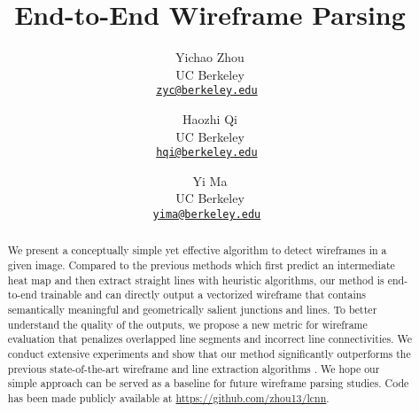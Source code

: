 \documentclass[10pt,twocolumn,letterpaper]{article}
\newcommand{\changeurlcolor}[1]{\hypersetup{urlcolor=#1}}
\begin{document}
\title{End-to-End Wireframe Parsing}

\author{Yichao Zhou \\
UC Berkeley \\
\tt \changeurlcolor{black}\href{mailto:zyc@berkeley.edu}{zyc@berkeley.edu}
\and
Haozhi Qi\\
UC Berkeley \\
\tt \changeurlcolor{black}\href{mailto:hqi@berkeley.edu}{hqi@berkeley.edu}
\and
Yi Ma\\
UC Berkeley \\
\tt \changeurlcolor{black}\href{mailto:yima@berkeley.edu}{yima@berkeley.edu}
}

\maketitle

\setlength{\abovedisplayskip}{5pt}
\setlength{\belowdisplayskip}{5pt}
\addtolength{\textfloatsep}{-8pt}
\setlength{\belowcaptionskip}{-2pt}


\begin{abstract}

We present a conceptually simple yet effective algorithm to detect wireframes \cite{Huang:2018:LPW} in a given image. Compared to the previous methods \cite{Huang:2018:LPW,xue2018learning} which first predict an intermediate heat map and then extract straight lines with heuristic algorithms, our method is end-to-end trainable and can directly output a vectorized wireframe that contains semantically meaningful and geometrically salient junctions and lines. To better understand the quality of the outputs, we propose a new metric for wireframe evaluation that penalizes overlapped line segments and incorrect line connectivities. We conduct extensive experiments and show that our method significantly outperforms the previous state-of-the-art wireframe and line extraction algorithms \cite{Huang:2018:LPW,xue2018learning,von2010lsd}. We hope our simple approach can be served as a baseline for future wireframe parsing studies. Code has been made publicly available at \url{https://github.com/zhou13/lcnn}.

\end{abstract}
\end{document}
